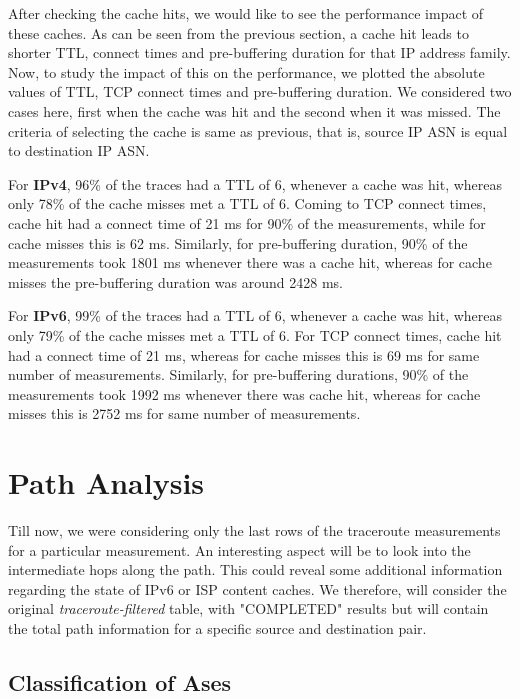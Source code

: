 After checking the cache hits, we would like to see the performance impact of these caches. As can be seen from the previous section, a cache hit leads to shorter TTL, 
connect times and pre-buffering duration for that IP address family. Now, to study the impact of this on the performance, we plotted the absolute values of TTL, 
TCP connect times and pre-buffering duration. We considered two cases here, first when the cache was hit and the second when it was missed. 
The criteria of selecting the cache is same as previous, that is, source IP ASN is equal to destination IP ASN.

For \textbf{IPv4}, 96\% of the traces had a TTL of 6, whenever a cache was hit, whereas only 78\% of the cache misses met a TTL of 6. Coming to TCP connect times, cache hit had a connect time of
21 ms for 90\% of the measurements, while for cache misses this is 62 ms. Similarly, for pre-buffering duration, 90\% of the measurements took 1801 ms whenever there was a cache hit, whereas for cache misses
the pre-buffering duration was around 2428 ms.


For \textbf{IPv6}, 99\% of the traces had a TTL of 6, whenever a cache was hit, whereas only 79\% of the cache misses met a TTL of 6. For TCP connect times, cache hit had a connect time of
21 ms, whereas for cache misses this is 69 ms for same number of measurements. Similarly, for pre-buffering durations, 90\% of the measurements took 1992 ms whenever there was cache hit, whereas for cache misses this is 2752 ms
for same number of measurements. 

\FloatBarrier

\section{Path Analysis}

Till now, we were considering only the last rows of the traceroute measurements for a particular measurement. An interesting aspect will be to look into the intermediate 
hops along the path. This could reveal some additional information regarding the state of IPv6 or ISP content caches. We therefore, will consider the 
original \textit{traceroute-filtered} table, with "COMPLETED" results but will contain the total path information for a specific source and destination pair.

\subsection*{Classification of Ases}

